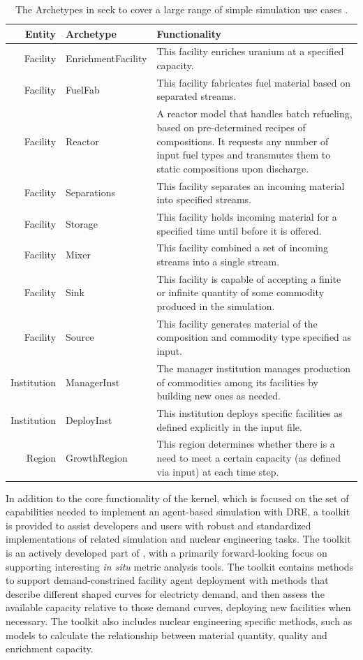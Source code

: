 \begin{table}[htb]
\centering
\begin{tabularx}{\textwidth}{rlX}
\hline
\textbf{Entity} & \textbf{Archetype} & \textbf{Functionality} \\
\hline
Facility & EnrichmentFacility & This facility enriches uranium at a specified capacity. \\
Facility & FuelFab & This facility fabricates fuel material based on separated streams. \\
Facility & Reactor & A reactor model that handles batch refueling, based on pre-determined recipes of compositions. It requests any number of input fuel types and transmutes them to static compositions upon discharge.\\
Facility & Separations & This facility separates an incoming material into specified streams. \\
Facility & Storage & This facility holds incoming material for a specified time until before it is offered. \\
Facility & Mixer & This facility combined a set of incoming streams into a single stream. \\
Facility & Sink & This facility is capable of accepting a finite or infinite quantity of some commodity produced in the simulation. \\
Facility & Source & This facility generates material of the composition and commodity type specified as input.  \\
Institution & ManagerInst & The manager institution manages production of commodities among its facilities by building new ones as needed. \\
Institution & DeployInst &  This institution deploys specific facilities as defined explicitly in the input file. \\
Region & GrowthRegion & This region determines whether there is a need to meet a certain capacity (as defined via input) at each time step. \\
\hline
\end{tabularx}
\caption{The Archetypes in \Cycamore seek to cover a large range of simple
simulation use cases \cite{carlsen_cycamore_2014}.}
\label{tab:cycamore}
\end{table}

In addition to the core functionality of the \Cyclus kernel, which is focused
on the set of capabilities needed to implement an agent-based simulation with
\gls{DRE}, a toolkit is provided to assist developers and users with robust
and standardized implementations of related simulation and nuclear engineering
tasks. The toolkit is an actively developed part of \Cyclus, with a primarily
forward-looking focus on supporting interesting \textit{in situ} metric
analysis tools.  The toolkit contains methods to support demand-constrined
facility agent deployment with methods that describe different shaped curves
for electricty demand, and then assess the available capacity relative to
those demand curves, deploying new facilities when necessary.  The toolkit
also includes nuclear engineering specific methods, such as models to
calculate the relationship between material quantity, quality and enrichment
capacity.

